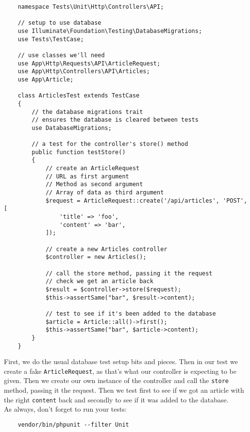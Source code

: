 \begin{verbatim}
    namespace Tests\Unit\Http\Controllers\API;

    // setup to use database
    use Illuminate\Foundation\Testing\DatabaseMigrations;
    use Tests\TestCase;

    // use classes we'll need
    use App\Http\Requests\API\ArticleRequest;
    use App\Http\Controllers\API\Articles;
    use App\Article;

    class ArticlesTest extends TestCase
    {
        // the database migrations trait
        // ensures the database is cleared between tests
        use DatabaseMigrations;

        // a test for the controller's store() method
        public function testStore()
        {
            // create an ArticleRequest
            // URL as first argument
            // Method as second argument
            // Array of data as third argument
            $request = ArticleRequest::create('/api/articles', 'POST', [
                'title' => 'foo',
                'content' => 'bar',
            ]);

            // create a new Articles controller
            $controller = new Articles();

            // call the store method, passing it the request
            // check we get an article back
            $result = $controller->store($request);
            $this->assertSame("bar", $result->content);

            // test to see if it's been added to the database
            $article = Article::all()->first();
            $this->assertSame("bar", $article->content);
        }
    }
\end{verbatim}

First, we do the usual database test setup bits and pieces. Then in our test we create a fake \texttt{ArticleRequest}, as that's what our controller is expecting to be given. Then we create our own instance of the controller and call the \texttt{store} method, passing it the request. Then we test first to see if we got an article with the right \texttt{content} back and secondly to see if it was added to the database.
\\

As always, don't forget to run your tests:

\begin{verbatim}
    vendor/bin/phpunit --filter Unit
\end{verbatim}

